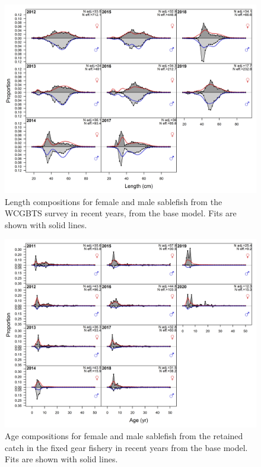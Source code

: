 \documentclass[11pt,
  english,
  a4paper,
]{article}
\begin{document}
\begin{figure}
\centering
\includegraphics[width=1\textwidth,height=1\textheight]{figs/torc_fleet8_lencomps.png}
\caption{Length compositions for female and male sablefish from the WCGBTS survey in recent years, from the base model. Fits are shown with solid lines. \label{fig:torcfleet8lencomps}}
\end{figure}

\tagmcend\tagstructend


\begin{figure}
\centering
\includegraphics[width=1\textwidth,height=1\textheight]{figs/torc_fleet1_agecomps.png}
\caption{Age compositions for female and male sablefish from the retained catch in the fixed gear fishery in recent years from the base model. Fits are shown with solid lines. \label{fig:torcfleet1agecomps}}
\end{figure}
\end{document}
